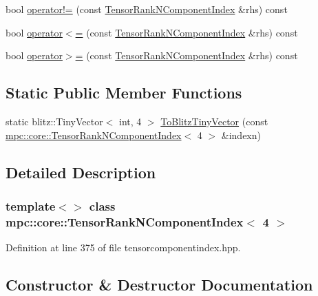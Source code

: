 \begin{DoxyCompactItemize}
\item 
bool \mbox{\hyperlink{classmpc_1_1core_1_1_tensor_rank_n_component_index_3_014_01_4_a7263c75cd59cf45d97c8ae280b032bbe}{operator!=}} (const \mbox{\hyperlink{classmpc_1_1core_1_1_tensor_rank_n_component_index}{Tensor\+Rank\+N\+Component\+Index}} \&rhs) const
\item 
bool \mbox{\hyperlink{classmpc_1_1core_1_1_tensor_rank_n_component_index_3_014_01_4_a8b769dced61936469fae1927250b29cb}{operator$<$=}} (const \mbox{\hyperlink{classmpc_1_1core_1_1_tensor_rank_n_component_index}{Tensor\+Rank\+N\+Component\+Index}} \&rhs) const
\item 
bool \mbox{\hyperlink{classmpc_1_1core_1_1_tensor_rank_n_component_index_3_014_01_4_a8a4bc0a78a02a19e01e7742e328197f4}{operator$>$=}} (const \mbox{\hyperlink{classmpc_1_1core_1_1_tensor_rank_n_component_index}{Tensor\+Rank\+N\+Component\+Index}} \&rhs) const
\end{DoxyCompactItemize}
\subsection*{Static Public Member Functions}
\begin{DoxyCompactItemize}
\item 
static blitz\+::\+Tiny\+Vector$<$ int, 4 $>$ \mbox{\hyperlink{classmpc_1_1core_1_1_tensor_rank_n_component_index_3_014_01_4_a9077a731652e4c75813a7fc77c048a92}{To\+Blitz\+Tiny\+Vector}} (const \mbox{\hyperlink{classmpc_1_1core_1_1_tensor_rank_n_component_index}{mpc\+::core\+::\+Tensor\+Rank\+N\+Component\+Index}}$<$ 4 $>$ \&indexn)
\end{DoxyCompactItemize}


\subsection{Detailed Description}
\subsubsection*{template$<$$>$\newline
class mpc\+::core\+::\+Tensor\+Rank\+N\+Component\+Index$<$ 4 $>$}



Definition at line 375 of file tensorcomponentindex.\+hpp.



\subsection{Constructor \& Destructor Documentation}
\mbox{\label{classmpc_1_1core_1_1_tensor_rank_n_component_index_3_014_01_4_ad0409ae149b77534b6ebe8c5c505da34}} 
